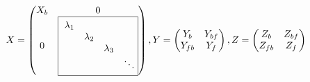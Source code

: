 \begin{equation}
X = \begin{pmatrix}
X_b & 0\\
0&\framebox{ $\begin{matrix}
\lambda_1 &&&\\
&\lambda_2&&\\
&&\lambda_3&\\
&&&\ddots
\end{matrix}$}
\end{pmatrix},
Y = \begin{pmatrix} Y_{b} & Y_{bf}\\
Y_{fb}& Y_f
\end{pmatrix}
, Z = \begin{pmatrix} Z_{b} & Z_{bf}\\
Z_{fb}& Z_f
\end{pmatrix}
\end{equation}


